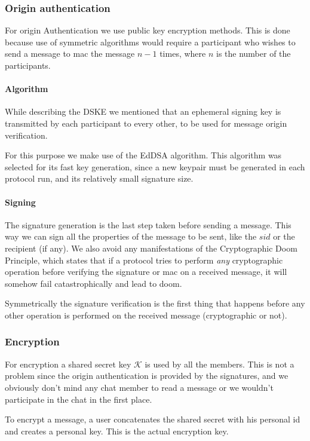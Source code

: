 \subsubsection{Origin authentication}
For origin Authentication we use public key encryption methods. This is done because use of symmetric algorithms would require a participant who wishes to send a message to mac the message $n-1$ times, where $n$ is the number of the participants.

\paragraph{Algorithm}
While describing the DSKE we mentioned that an ephemeral signing key is transmitted by each participant to every other, to be used for message origin verification.

For this purpose we make use of the EdDSA algorithm. This algorithm was selected for its fast key generation, since a new keypair must be generated in each protocol run, and its relatively small signature size.

\paragraph{Signing}
\label{signing}
The signature generation is the last step taken before sending a message. This
way we can sign all the properties of the message to be sent, like the $sid$ or the
recipient (if any). We also avoid any manifestations of the Cryptographic Doom
Principle, which states that if a protocol tries to perform \emph{any}
cryptographic operation before verifying the signature or mac on a received
message, it will somehow fail catastrophically and lead to doom.

Symmetrically the signature verification is the first thing that happens before
any other operation is performed on the received message (cryptographic or not).

\subsubsection{Encryption}

For encryption a shared secret key $\mathcal{K}$ is used by all the members. This is not a problem since the origin authentication is provided by the signatures, and we obviously don't mind any chat member to read a message or we wouldn't participate in the chat in the first place.

To encrypt a message, a user concatenates the shared secret with his personal id and creates a personal key.
This is the actual encryption key.

